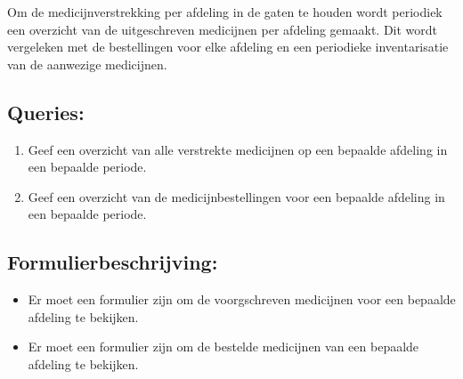 
Om de medicijnverstrekking per afdeling in de gaten te houden wordt
periodiek een overzicht van de uitgeschreven medicijnen per afdeling
gemaakt. Dit wordt vergeleken met de bestellingen voor elke afdeling
en een periodieke inventarisatie van de aanwezige medicijnen.


\subsection*{Queries:}
\begin{enumerate}
  \item Geef een overzicht van alle verstrekte medicijnen op een
  bepaalde afdeling in een bepaalde periode.
  \item Geef een overzicht van de medicijnbestellingen voor een
  bepaalde afdeling in een bepaalde periode.

\end{enumerate}

\subsection*{Formulierbeschrijving:}
\begin{itemize}
\item Er moet een formulier zijn om de voorgschreven medicijnen voor een bepaalde afdeling te bekijken.
\item Er moet een formulier zijn om de bestelde medicijnen van een bepaalde afdeling te bekijken.
\end{itemize}